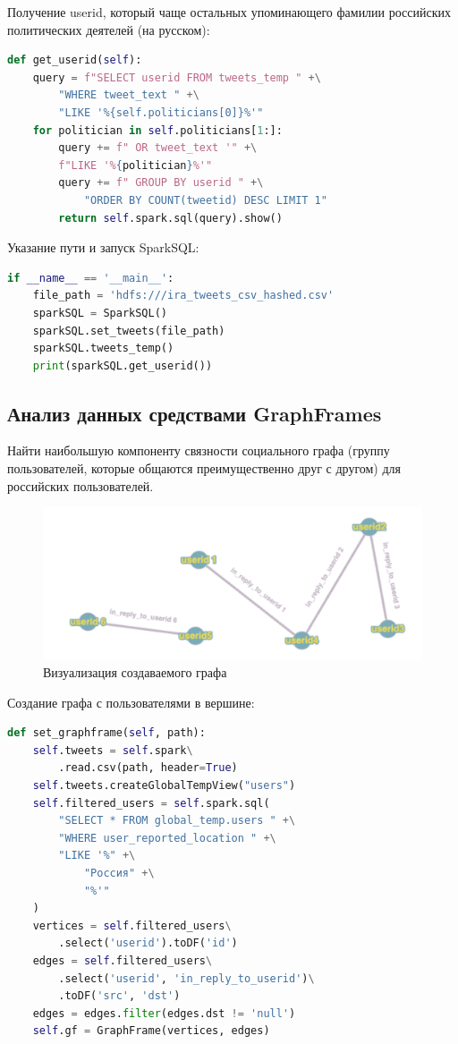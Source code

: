 Получение userid, который чаще остальных упоминающего фамилии российских политических деятелей (на русском):

\begin{lstlisting}[language={Python}, caption={Получение userid}, label=lst:sql3]
def get_userid(self):
	query = f"SELECT userid FROM tweets_temp " +\
		"WHERE tweet_text " +\
		"LIKE '%{self.politicians[0]}%'"
	for politician in self.politicians[1:]:
		query += f" OR tweet_text '" +\
		f"LIKE '%{politician}%'"
		query += f" GROUP BY userid " +\
			"ORDER BY COUNT(tweetid) DESC LIMIT 1"
		return self.spark.sql(query).show()
\end{lstlisting}

Указание пути и запуск SparkSQL:

\begin{lstlisting}[language={Python}, caption={Запуск SparkSQL}, label=lst:sql4]
if __name__ == '__main__':
	file_path = 'hdfs:///ira_tweets_csv_hashed.csv'
	sparkSQL = SparkSQL()
	sparkSQL.set_tweets(file_path)
	sparkSQL.tweets_temp()
	print(sparkSQL.get_userid())
\end{lstlisting}

\subsection{Анализ данных средствами GraphFrames}

Найти наибольшую компоненту связности социального графа (группу пользователей, которые общаются преимущественно друг с другом) для российских пользователей.

\begin{figure}[htb]
	\centering
	\includegraphics[width=.9\textwidth]{graph.png}
	\parskip=6pt
	\caption{Визуализация создаваемого графа}
	\label{fig:gfpic}
\end{figure}

Создание графа с пользователями в вершине:

\begin{lstlisting}[language={Python}, caption={Создание графа}, label=lst:gf1]
def set_graphframe(self, path):
	self.tweets = self.spark\
		.read.csv(path, header=True)
	self.tweets.createGlobalTempView("users")
	self.filtered_users = self.spark.sql(
		"SELECT * FROM global_temp.users " +\
		"WHERE user_reported_location " +\
		"LIKE '%" +\
			"Россия" +\
			"%'"
	)
	vertices = self.filtered_users\
		.select('userid').toDF('id')
	edges = self.filtered_users\
		.select('userid', 'in_reply_to_userid')\
		.toDF('src', 'dst')
	edges = edges.filter(edges.dst != 'null')
	self.gf = GraphFrame(vertices, edges)
\end{lstlisting}

